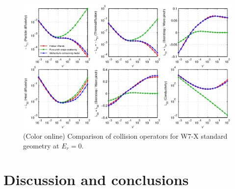 \documentclass[12pt]{revtex4}
\begin{document}
\begin{figure}[h!]
\includegraphics{m20131208_01_plotSFINCSFortranAndMatlabNuScansForPaper_W7X.eps}
\caption{(Color online) Comparison of collision operators for W7-X standard geometry at $E_r=0$.
\label{fig:collisionComparison_W7X}}
\end{figure}


\section{Discussion and conclusions}
\label{sec:conclusions}
\end{document}

